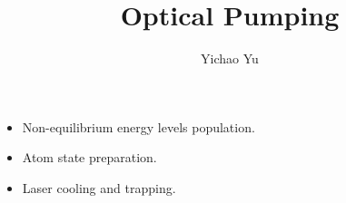 \documentclass{beamer}
\title[Optical Pumping\hspace{2em}\tiny{\timeleft}]{Optical Pumping}
\author{Yichao Yu}
\institute{MIT}
\def\timeleft{15:00->14:55}
\begin{document}
\begin{frame}{}
  \titlepage
\end{frame}

\def\timeleft{14:55->14:20}
\begin{frame}{}
  \begin{block}{}
    \begin{itemize}[<+->]
    \item
      Non-equilibrium energy levels population.
    \item
      Atom state preparation.
    \item
      Laser cooling and trapping.
    \end{itemize}
  \end{block}
  \begin{center}
  \end{center}
\end{frame}

\def\timeleft{14:20->13:50}
\begin{frame}
  \tableofcontents
\end{frame}

\def\timeleft{13:50->11:40}
\end{document}
